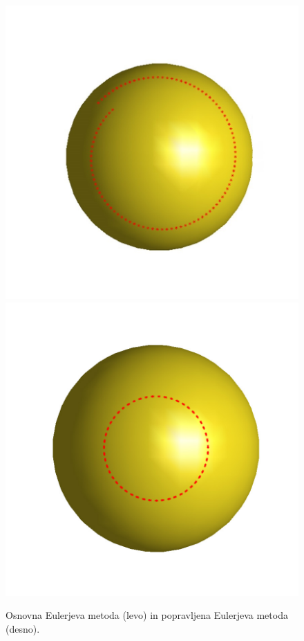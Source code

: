 \documentclass[12pt]{article}
\begin{document}
	\begin{figure}[H]
		\centering
		\includegraphics[scale=0.3]{eul1}
		\includegraphics[scale=0.3]{eul3_newt}
		\caption{Osnovna Eulerjeva metoda (levo) in popravljena Eulerjeva metoda (desno).}
		\label{slika:eul1,eul3_newt}
	\end{figure}
\end{document}
